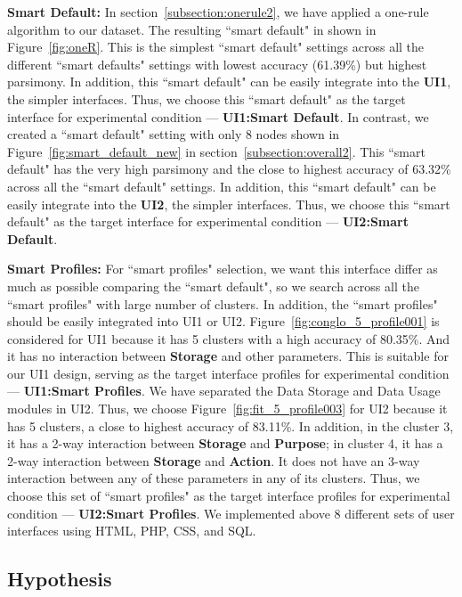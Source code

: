 \textbf{Smart Default:} In section~\ref{subsection:onerule2}, we have applied a one-rule algorithm to our dataset. The resulting ``smart default" in shown in Figure~\ref{fig:oneR}. This is the simplest ``smart default" settings across all the different ``smart defaults" settings with lowest accuracy (61.39\%) but highest parsimony. In addition, this ``smart default" can be easily integrate into the \textbf{UI1}, the simpler interfaces. Thus, we choose this ``smart default" as the target interface for experimental condition --- \textbf{UI1:Smart Default}. In contrast, we created a ``smart default" setting with only 8 nodes shown in Figure~\ref{fig:smart_default_new} in section~\ref{subsection:overall2}. This ``smart default" has the very high parsimony and the close to highest accuracy of 63.32\% across all the ``smart default" settings. In addition, this ``smart default" can be easily integrate into the \textbf{UI2}, the simpler interfaces. Thus, we choose this ``smart default" as the target interface for experimental condition --- \textbf{UI2:Smart Default}.

\textbf{Smart Profiles:} For ``smart profiles" selection, we want this interface differ as much as possible comparing the ``smart default", so we search across all the ``smart profiles" with large number of clusters. In addition, the ``smart profiles" should be easily integrated into UI1 or UI2. Figure~\ref{fig:conglo_5_profile001} is considered for UI1 because it has 5 clusters with a high accuracy of 80.35\%. And it has no interaction between \textbf{Storage} and other parameters. This is suitable for our UI1 design, serving as the target interface profiles for experimental condition --- \textbf{UI1:Smart Profiles}. We have separated the Data Storage and Data Usage modules in UI2. Thus, we choose Figure~\ref{fig:fit_5_profile003} for UI2 because it has 5 clusters, a close to highest accuracy of 83.11\%. In addition, in the cluster 3, it has a 2-way interaction between \textbf{Storage} and \textbf{Purpose}; in cluster 4, it has a 2-way interaction between \textbf{Storage} and \textbf{Action}. It does not have an 3-way interaction between any of these parameters in any of its clusters. Thus, we choose this set of ``smart profiles" as the target interface profiles for experimental condition --- \textbf{UI2:Smart Profiles}. We implemented above 8 different sets of user interfaces using HTML, PHP, CSS, and SQL.

\subsection{Hypothesis}

